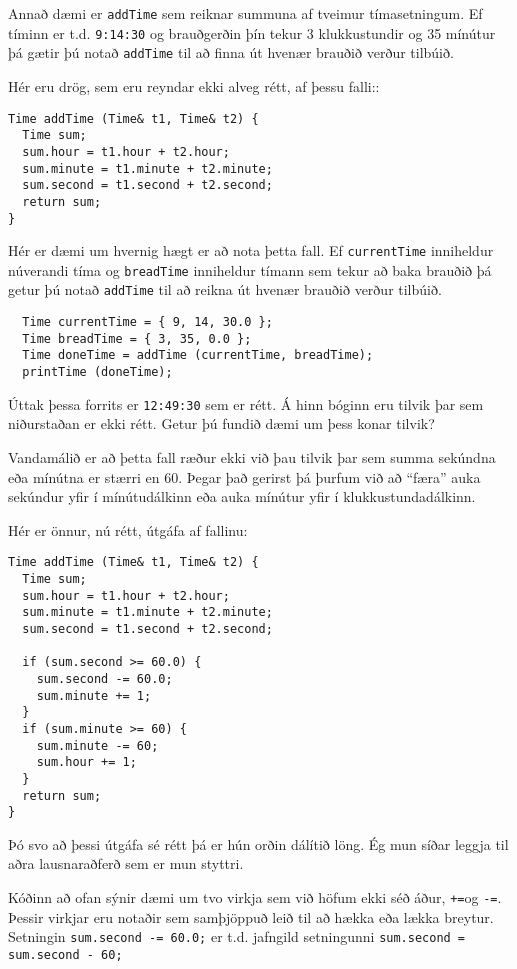 Annað dæmi er {\tt addTime} sem reiknar summuna af tveimur tímasetningum.
Ef tíminn er t.d. {\tt 9:14:30} og brauðgerðin þín tekur 3 klukkustundir og 35 mínútur þá gætir þú notað {\tt addTime} til að finna út hvenær brauðið verður tilbúið.

Hér eru drög, sem eru reyndar ekki alveg rétt, af þessu falli::

\begin{verbatim}
Time addTime (Time& t1, Time& t2) {
  Time sum;
  sum.hour = t1.hour + t2.hour;
  sum.minute = t1.minute + t2.minute;
  sum.second = t1.second + t2.second;
  return sum;
}
\end{verbatim}
%
Hér er dæmi um hvernig hægt er að nota þetta fall.
Ef {\tt currentTime} inniheldur núverandi tíma og {\tt breadTime} inniheldur tímann sem tekur að baka brauðið þá getur þú notað {\tt addTime} til að reikna út hvenær brauðið verður tilbúið.

\begin{verbatim}
  Time currentTime = { 9, 14, 30.0 };
  Time breadTime = { 3, 35, 0.0 };
  Time doneTime = addTime (currentTime, breadTime);
  printTime (doneTime);
\end{verbatim}
%
Úttak þessa forrits er {\tt 12:49:30} sem er rétt.
Á hinn bóginn eru tilvik þar sem niðurstaðan er ekki rétt.
Getur þú fundið dæmi um þess konar tilvik?

Vandamálið er að þetta fall ræður ekki við þau tilvik þar sem summa sekúndna eða mínútna er stærri en 60.
Þegar það gerirst þá þurfum við að ``færa'' auka sekúndur yfir í mínútudálkinn eða auka mínútur yfir í klukkustundadálkinn.

Hér er önnur, nú rétt, útgáfa af fallinu:

\begin{verbatim}
Time addTime (Time& t1, Time& t2) {
  Time sum;
  sum.hour = t1.hour + t2.hour;
  sum.minute = t1.minute + t2.minute;
  sum.second = t1.second + t2.second;

  if (sum.second >= 60.0) {
    sum.second -= 60.0;
    sum.minute += 1;
  }
  if (sum.minute >= 60) {
    sum.minute -= 60;
    sum.hour += 1;
  }
  return sum;
}
\end{verbatim}
%
Þó svo að þessi útgáfa sé rétt þá er hún orðin dálítið löng.
Ég mun síðar leggja til aðra lausnaraðferð sem er mun styttri.


Kóðinn að ofan sýnir dæmi um tvo virkja sem við höfum ekki séð áður, {\tt +=}og {\tt -=}.
Þessir virkjar eru notaðir sem samþjöppuð leið til að hækka eða lækka breytur.
Setningin {\tt sum.second -= 60.0;} er t.d. jafngild setningunni {\tt sum.second = sum.second - 60;}

